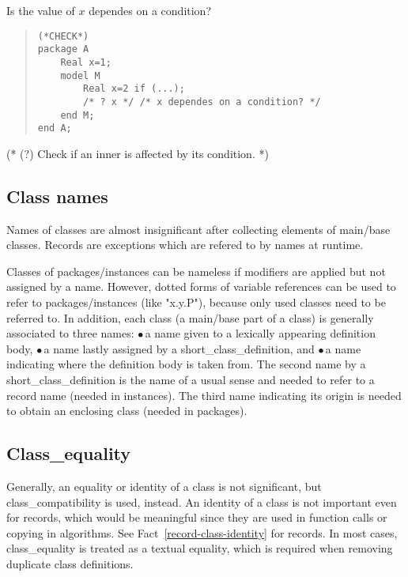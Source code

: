\documentclass[10pt,b5paper]{article}
\begin{document}
Is the value of $x$ dependes on a condition?
\begin{quote}
\begin{lstlisting}[aboveskip=-\baselineskip]
(*CHECK*)
package A
    Real x=1;
    model M
        Real x=2 if (...);
        /* ? x */ /* x dependes on a condition? */
    end M;
end A;
\end{lstlisting}
\end{quote}

(* (?) Check if an inner is affected by its condition. *)


\subsection{Class names}

Names of classes are almost insignificant after collecting elements of
main/base classes.  Records are exceptions which are refered to by
names at runtime.

Classes of packages/instances can be nameless if modifiers are applied
but not assigned by a name.  However, dotted forms of variable
references can be used to refer to packages/instances (like "x.y.P"),
because only used classes need to be referred to.  In addition, each
class (a main/base part of a class) is generally associated to three
names: $\bullet$\,a name given to a lexically appearing definition
body, $\bullet$\,a name lastly assigned by a short_class_definition,
and $\bullet$\,a name indicating where the definition body is taken
from.  The second name by a short_class_definition is the name of a
usual sense and needed to refer to a record name (needed in
instances).  The third name indicating its origin is needed to obtain
an enclosing class (needed in packages).


\subsection{Class_equality}\label{class-equality}

Generally, an equality or identity of a class is not significant, but
class_compatibility is used, instead.  An identity of a class is not
important even for records, which would be meaningful since they are
used in function calls or copying in algorithms.  See
Fact~\ref{record-class-identity} for records.  In most cases,
class_equality is treated as a textual equality, which is required
when removing duplicate class definitions.
\end{document}
